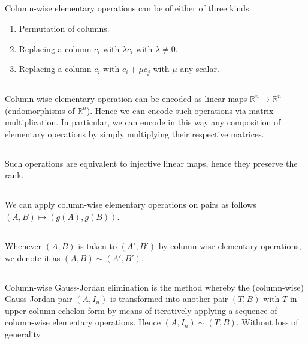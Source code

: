 \documentclass{proc-l}
\theoremstyle{definition}
\theoremstyle{remark}
\numberwithin{equation}{section}
\newcommand{\R}{\mathbb{R}}
\begin{document}
\subsection{}
Column-wise elementary operations can be of either of three kinds:
\begin{enumerate}
\item Permutation of columns.
\item Replacing a column $c_i$ with $\lambda c_i$ with $\lambda \neq 0$.
\item Replacing a column $c_i$ with $c_i + \mu c_j$ with $\mu$ any scalar.
\end{enumerate}

\subsection{}
Column-wise elementary operation can be encoded as linear maps $\R^n \to \R^n$ (endomorphisms of $\R^n$). Hence we can encode such operations via matrix multiplication. In particular, we can encode in this way any composition of elementary operations by simply multiplying their respective matrices.

\subsection{}
Such operations are equivalent to injective linear maps, hence they preserve the rank.

\subsection{}
We can apply column-wise elementary operations on pairs as follows $(A, B) \mapsto (g(A), g(B))$.

\subsection{}
Whenever $(A, B)$ is taken to $(A', B')$ by column-wise elementary operations, we denote it as $(A, B) \sim (A', B')$.

\subsection{}
Column-wise Gauss-Jordan elimination is the method whereby the (column-wise) Gauss-Jordan pair $(A, I_n)$ is transformed into another pair $(T, B)$ with $T$ in upper-column-echelon form by means of iteratively applying a sequence of column-wise elementary operations. Hence $(A, I_n)\sim (T, B)$. Without loss of generality
\end{document}
